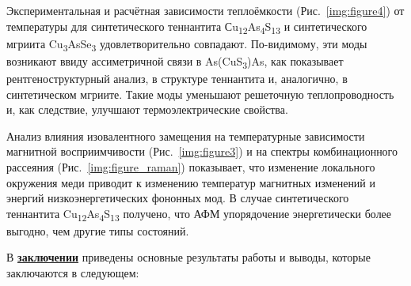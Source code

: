 


Экспериментальная и расчётная зависимости теплоёмкости (Рис.~\ref{img:figure4}) от температуры для синтетического теннантита Сu\textsubscript{12}As\textsubscript{4}S\textsubscript{13} и  синтетического мгриита Cu\textsubscript{3}AsSe\textsubscript{3} удовлетворительно совпадают.
По-видимому, эти моды возникают ввиду ассиметричной связи в As(CuS\textsubscript{3})As, как показывает рентгеноструктурный анализ, в структуре теннантита и, аналогично, в синтетическом мгриите. Такие моды уменьшают решеточную теплопроводность и, как следствие, улучшают термоэлектрические свойства.

Анализ влияния изовалентного замещения на температурные зависимости магнитной восприимчивости (Рис.~\ref{img:figure3}) и на спектры комбинационного рассеяния (Рис.~\ref{img:figure_raman}) показывает, что изменение локального окружения меди приводит к изменению температур магнитных изменений и энергий низкоэнергетических фононных мод. В случае синтетического теннантита Cu\textsubscript{12}As\textsubscript{4}S\textsubscript{13} получено, что АФМ упорядочение энергетически более выгодно, чем другие типы состояний.

В \underline{\textbf{заключении}} приведены основные результаты работы и выводы, которые заключаются в следующем:




